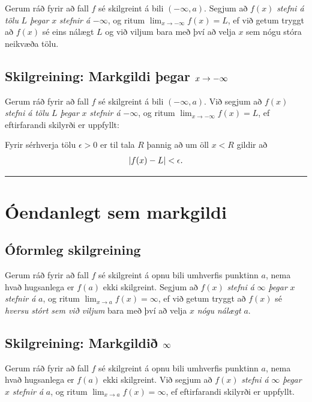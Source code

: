 \documentclass[a4paper,10pt,icelandic]{sphinxmanual}
\begin{document}
Gerum ráð fyrir að fall \(f\) sé skilgreint á bili
\((-\infty, a)\). Segjum að \(f(x)\) \emph{stefni á tölu} \(L\)
\emph{þegar} \(x\) \emph{stefnir á} \(-\infty\), og ritum
\(\lim_{x\rightarrow -\infty} f(x)=L\), ef við getum tryggt að
\(f(x)\) sé eins nálægt \(L\) og við viljum bara með því að
velja \(x\) sem nógu stóra neikvæða tölu.


\subsection{Skilgreining: Markgildi þegar \protect\(x \to -\infty\protect\)}
\label{kafli02:id6}
Gerum ráð fyrir að fall \(f\) sé skilgreint á bili
\((-\infty,a)\). Við segjum að \(f(x)\) \emph{stefni á tölu}
\(L\) \emph{þegar} \(x\) \emph{stefnir á} \(-\infty\), og ritum
\(\lim_{x\rightarrow -\infty} f(x)=L\), ef eftirfarandi skilyrði er
uppfyllt:

Fyrir sérhverja tölu \(\epsilon>0\) er til tala \(R\)
þannig að um öll \(x<R\) gildir að
\begin{gather}
\begin{split}|f(x)-L|<\epsilon.\end{split}\notag
\end{gather}

\bigskip\hrule{}\bigskip



\section{Óendanlegt sem markgildi}
\label{kafli02:oendanlegt-sem-markgildi}

\subsection{Óformleg skilgreining}
\label{kafli02:id7}\label{kafli02:index-5}
Gerum ráð fyrir að fall \(f\) sé skilgreint á opnu bili umhverfis
punktinn \(a\), nema hvað hugsanlega er \(f(a)\) ekki
skilgreint. Segjum að \(f(x)\) \emph{stefni á} \(\infty\) \emph{þegar}
\(x\) \emph{stefnir á} \(a\), og ritum
\(\lim_{x\rightarrow a} f(x)=\infty\), ef við getum tryggt að
\(f(x)\) sé \emph{hversu stórt sem við viljum} bara með því að velja
\(x\) \emph{nógu nálægt} \(a\).


\subsection{Skilgreining: Markgildið \protect\(\infty\protect\)}
\label{kafli02:id8}
Gerum ráð fyrir að fall \(f\) sé skilgreint á opnu bili umhverfis
punktinn \(a\), nema hvað hugsanlega er \(f(a)\) ekki
skilgreint. Við segjum að \(f(x)\) \emph{stefni á} \(\infty\) \emph{þegar}
\(x\) \emph{stefnir á} \(a\), og ritum
\(\lim_{x\rightarrow a} f(x)=\infty\), ef eftirfarandi skilyrði er
uppfyllt.
\end{document}

